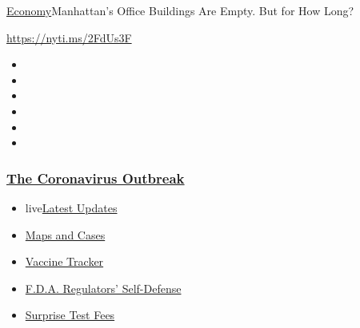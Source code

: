 \href{/section/business/economy}{Economy}\textbar{}Manhattan's Office
Buildings Are Empty. But for How Long?

\url{https://nyti.ms/2FdUs3F}

\begin{itemize}
\item
\item
\item
\item
\item
\item
\end{itemize}

\hypertarget{the-coronavirus-outbreak}{%
\subsubsection{\texorpdfstring{\href{https://www.nytimes3xbfgragh.onion/news-event/coronavirus?name=styln-coronavirus-markets\&region=TOP_BANNER\&block=storyline_menu_recirc\&action=click\&pgtype=Article\&impression_id=8a64dc40-f4c2-11ea-9322-a3eb5bc47b4b\&variant=undefined}{The
Coronavirus
Outbreak}}{The Coronavirus Outbreak}}\label{the-coronavirus-outbreak}}

\begin{itemize}
\tightlist
\item
  live\href{https://www.nytimes3xbfgragh.onion/2020/09/11/world/covid-19-coronavirus.html?name=styln-coronavirus-markets\&region=TOP_BANNER\&block=storyline_menu_recirc\&action=click\&pgtype=Article\&impression_id=8a64dc41-f4c2-11ea-9322-a3eb5bc47b4b\&variant=undefined}{Latest
  Updates}
\item
  \href{https://www.nytimes3xbfgragh.onion/interactive/2020/us/coronavirus-us-cases.html?name=styln-coronavirus-markets\&region=TOP_BANNER\&block=storyline_menu_recirc\&action=click\&pgtype=Article\&impression_id=8a64dc42-f4c2-11ea-9322-a3eb5bc47b4b\&variant=undefined}{Maps
  and Cases}
\item
  \href{https://www.nytimes3xbfgragh.onion/interactive/2020/science/coronavirus-vaccine-tracker.html?name=styln-coronavirus-markets\&region=TOP_BANNER\&block=storyline_menu_recirc\&action=click\&pgtype=Article\&impression_id=8a64dc43-f4c2-11ea-9322-a3eb5bc47b4b\&variant=undefined}{Vaccine
  Tracker}
\item
  \href{https://www.nytimes3xbfgragh.onion/2020/09/10/us/politics/fda-coronavirus-vaccine.html?name=styln-coronavirus-markets\&region=TOP_BANNER\&block=storyline_menu_recirc\&action=click\&pgtype=Article\&impression_id=8a650350-f4c2-11ea-9322-a3eb5bc47b4b\&variant=undefined}{F.D.A.
  Regulators' Self-Defense}
\item
  \href{https://www.nytimes3xbfgragh.onion/2020/09/09/upshot/coronavirus-surprise-test-fees.html?name=styln-coronavirus-markets\&region=TOP_BANNER\&block=storyline_menu_recirc\&action=click\&pgtype=Article\&impression_id=8a650351-f4c2-11ea-9322-a3eb5bc47b4b\&variant=undefined}{Surprise
  Test Fees}
\end{itemize}

